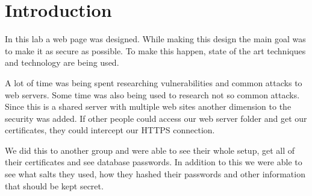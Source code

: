 \section{Introduction}

In this lab a web page was designed.
While making this design the main goal was to make it as secure as possible.
To make this happen, state of the art techniques and technology are being used.

A lot of time was being spent researching vulnerabilities and common attacks to web servers.
Some time was also being used to research not so common attacks.
Since this is a shared server with multiple web sites another dimension to the security was added.
If other people could access our web server folder and get our certificates, they could intercept our HTTPS connection.

We did this to another group and were able to see their whole setup, get all of their certificates and see database passwords.
In addition to this we were able to see what salts they used, how they hashed their passwords and other information that should be kept secret.
